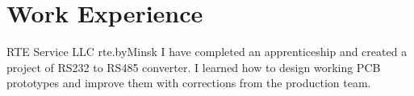 \section{Work Experience}
{RTE Service LLC rte.by}{Minsk}{}{ I have completed an apprenticeship
  and created a project of RS232 to RS485 converter. I learned how to
  design working PCB prototypes and improve them with corrections from
  the production team.}


